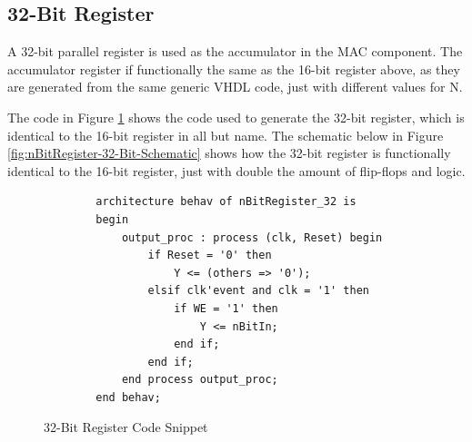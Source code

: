 \documentclass[11pt]{article}
\begin{document}
	\subsection{32-Bit Register}
		
		A 32-bit parallel register is used as the accumulator in the MAC component. The accumulator register if functionally the same as the 16-bit register above, as they are generated from the same generic VHDL code, just with different values for N.
		
		The code in Figure \ref{code:nBitRegister_32} shows the code used to generate the 32-bit register, which is identical to the 16-bit register in all but name. The schematic below in Figure \ref{fig:nBitRegister-32-Bit-Schematic} shows how the 32-bit register is functionally identical to the 16-bit register, just with double the amount of flip-flops and logic.
		
		\begin{figure}[H]
		\centering
		\begin{verbatim}
        architecture behav of nBitRegister_32 is
        begin
            output_proc : process (clk, Reset) begin
                if Reset = '0' then
                    Y <= (others => '0');
                elsif clk'event and clk = '1' then
                    if WE = '1' then
                        Y <= nBitIn;
                    end if;
                end if;
            end process output_proc;
        end behav;
        \end{verbatim}
        \caption{32-Bit Register Code Snippet} 
    	\label{code:nBitRegister_32} 
    \end{figure}
	
\end{document}
